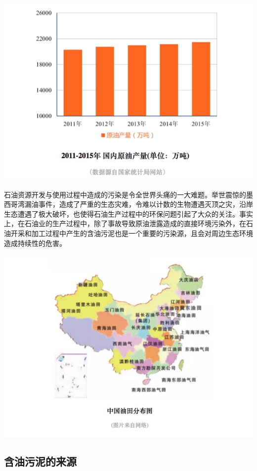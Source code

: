 \documentclass[]{book}
\begin{document}
\includegraphics[width=8.33in]{images/youni1}

石油资源开发与使用过程中造成的污染是令全世界头痛的一大难题。举世震惊的墨西哥湾漏油事件，造成了严重的生态灾难，令难以计数的生物遭遇灭顶之灾，沿岸生态遭遇了极大破坏，也使得石油生产过程中的环保问题引起了大众的关注。事实上，在石油业的生产过程中，除了事故导致原油泄露造成的直接环境污染外，在石油开采和加工过程中产生的含油污泥也是一个重要的污染源，且会对周边生态环境造成持续性的危害。

\includegraphics[width=8.33in]{images/youni2}

\subsection{含油污泥的来源}
\end{document}
